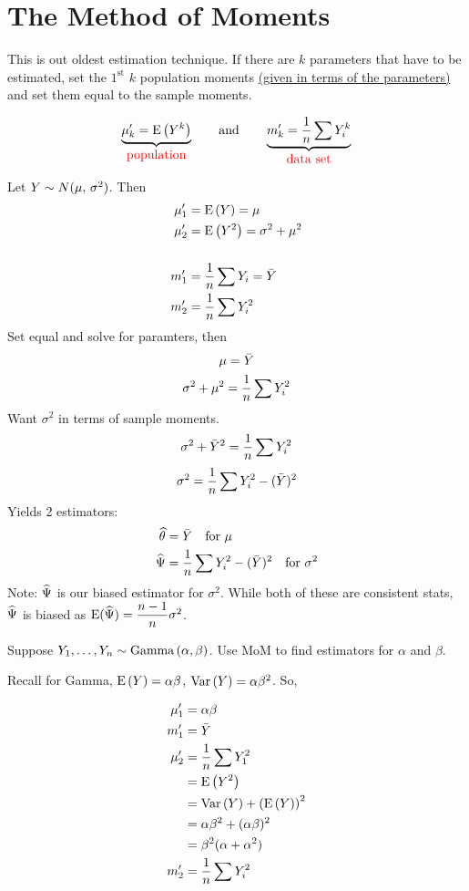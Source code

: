 \section{The Method of Moments}%
This is out oldest estimation technique. If there are $k$ parameters that have to be estimated, set the $1^{\text{st}}$ $k$ population moments \underline{(given in terms of the parameters)} and set them equal to the sample moments.

\recall*
$$\underbrace{\mu_k' = \E{Y^k}}_{\textstyle \text{\color{red}population}} \qquad \text{and} \qquad \underbrace{m_k' = \over{n}\sum Y_i^k}_{\textstyle \text{\color{red}data set}}$$

\example Let $Y \sim \normalDist*$. Then
\begin{align*}
\mu_1' &= \E{Y} = \mu\\
\mu_2' &= \E{Y^2} = \sigma^2 + \mu^2\\\\
m_1' &= \over{n}\sum Y_i = \Ybar\\
m_2' &= \over{n}\sum Y_i^2
\end{align*}
Set equal and solve for paramters, then 
$$\mu = \bar{Y}$$
$$\sigma^2 + \mu^2 = \over{n}\sum Y_i^2$$
Want $\sigma^2$ in terms of sample moments.
$$\sigma^2 + \Ybar ^2 = \over{n}\sum Y_i^2$$
$$\sigma^2 = \over{n}\sum Y_i^2 - (\Ybar)^2$$
Yields 2 estimators:
\begin{align*}
    \that &= \Ybar \quad \text{for } \mu\\
    \Psihat &= \over{n} \sum Y_i^2 - (\Ybar)^2 \quad \text{for } \sigma^2
\end{align*}
Note: $\widehat{\Psi}$ is our  biased estimator for $\sigma^2$. While both of these are consistent stats, $\widehat{\Psi}$ is biased as $\E*{\Psihat} = \dfrac{n-1}{n}\sigma^2$.

\example Suppose ${Y}_1, \dots, {Y}_n \sim \operatorname{Gamma} \left( {\alpha},{\beta} \right)$. Use MoM to find estimators for $\alpha$ and $\beta$.

\nnl Recall for Gamma, $\E{Y} = \alpha\beta$, $\Var{Y} = \alpha\beta^2$. So,

\begin{align*}
    \mu_1' &= \alpha\beta\\
    m_1' &= \Ybar\\
    \mu_2' &= \over{n}\sum Y_1^2\\
    &= \E{Y^2} \\
    &= \Var{Y} + \pars{\E{Y}}^2\\
    &= \alpha\beta^2 + (\alpha\beta)^2\\
    &= \beta^2(\alpha + \alpha^2)\\
    m_2' &= \over{n}\sum Y_i^2
\end{align*}

